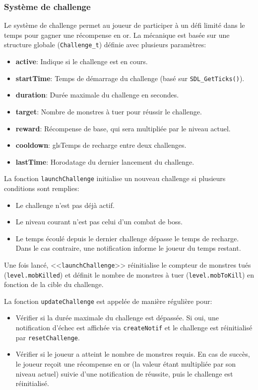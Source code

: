 \documentclass[11pt,a4paper]{article}
\begin{document}
\subsubsection{Système de challenge}
Le système de challenge permet au joueur de participer à un défi limité dans le temps pour gagner une récompense en or. La mécanique est basée sur une structure globale (\texttt{Challenge\_t}) définie avec plusieurs paramètres:
\begin{itemize}
    \item \textbf{active}: Indique si le challenge est en cours.
    \item \textbf{startTime}: Temps de démarrage du challenge (basé sur \texttt{SDL\_GetTicks()}).
    \item \textbf{duration}: Durée maximale du challenge en secondes.
    \item \textbf{target}: Nombre de monstres à tuer pour réussir le challenge.
    \item \textbf{reward}: Récompense de base, qui sera multipliée par le niveau actuel.
    \item \textbf{cooldown}: gls{Temps de recharge} entre deux challenges.
    \item \textbf{lastTime}: Horodatage du dernier lancement du challenge.
\end{itemize}

La fonction \texttt{launchChallenge} initialise un nouveau challenge si plusieurs conditions sont remplies:
\begin{itemize}
    \item Le challenge n'est pas déjà actif.
    \item Le niveau courant n'est pas celui d'un combat de boss.
    \item Le temps écoulé depuis le dernier challenge dépasse le temps de recharge. Dans le cas contraire, une notification informe le joueur du temps restant.
\end{itemize}

Une fois lancé, <<\texttt{launchChallenge}>> réinitialise le compteur de monstres tués (\texttt{level.mobKilled}) et définit le nombre de monstres à tuer (\texttt{level.mobToKill}) en fonction de la cible du challenge.

La fonction \texttt{updateChallenge} est appelée de manière régulière pour:
\begin{itemize}
    \item Vérifier si la durée maximale du challenge est dépassée. Si oui, une notification d'échec est affichée via \texttt{createNotif} et le challenge est réinitialisé par \texttt{resetChallenge}.
    \item Vérifier si le joueur a atteint le nombre de monstres requis. En cas de succès, le joueur reçoit une récompense en or (la valeur étant multipliée par son niveau actuel) suivie d'une notification de réussite, puis le challenge est réinitialisé.
\end{itemize}
\end{document}
